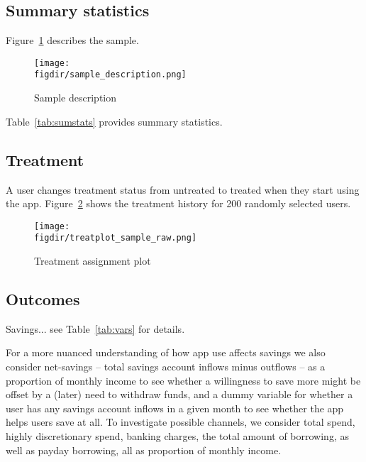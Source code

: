 \subsection{Summary statistics}%
\label{sub:summary_statistics}

Figure~\ref{fig:sample_description} describes the sample.

\begin{figure}[htpb]
    \centering
    \caption{Sample description}%
    \texttt{[image: \\figdir/sample\_description.png]}
    \label{fig:sample_description}
    \fignote{\textwidth}{}
\end{figure}

Table~\ref{tab:sumstats} provides summary statistics.




\subsection{Treatment}%
\label{sub:treatment}

A user changes treatment status from untreated to treated when they start using
the app. Figure~\ref{fig:treatplot_sample_raw} shows the treatment history for
200 randomly selected users.

\begin{figure}[htpb]
    \centering
    \caption{Treatment assignment plot}%
    \texttt{[image: \\figdir/treatplot\_sample\_raw.png]}
    \label{fig:treatplot_sample_raw}


\end{figure}


\subsection{Outcomes}%
\label{sub:outcomes}

Savings... see Table~\ref{tab:vars} for details.

For a more nuanced understanding of how app use affects savings we also
consider net-savings -- total savings account inflows minus outflows -- as a
proportion of monthly income to see whether a willingness to save more might be
offset by a (later) need to withdraw funds, and a dummy variable for whether a
user has any savings account inflows in a given month to see whether the app
helps users save at all. To investigate possible channels, we consider total
spend, highly discretionary spend, banking charges, the total amount of
borrowing, as well as payday borrowing, all as proportion of monthly income.



